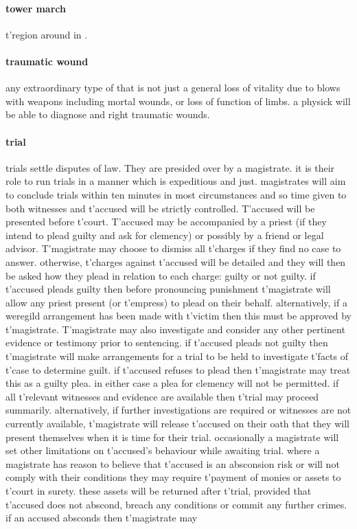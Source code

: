 \paragraph{tower march} t'\allowbreak region around  in .
\paragraph{traumatic wound} any extraordinary type of  that is not just a general loss of vitality due to blows with weapons including mortal wounds, or loss of function of limbs. a physick will be able to diagnose and right traumatic wounds.
\paragraph{trial} trials settle disputes of law. They are presided over by a magistrate. it is their role to run trials in a manner which is expeditious and just. magistrates will aim to conclude trials within ten minutes in most circumstances and so time given to both witnesses and t'\allowbreak accused will be strictly controlled. T'accused will be presented before t'\allowbreak court. T'accused may be accompanied by a priest (if they intend to plead guilty and ask for clemency) or possibly by a friend or legal advisor. T'magistrate may choose to dismiss all t'\allowbreak charges if they find no case to answer. otherwise, t'\allowbreak charges against t'\allowbreak accused will be detailed and they will then be asked how they plead in relation to each charge: guilty or not guilty. if t'\allowbreak accused pleads guilty then before pronouncing punishment t'\allowbreak magistrate will allow any priest present (or t'\allowbreak empress) to plead  on their behalf. alternatively, if a weregild arrangement has been made with t'\allowbreak victim then this must be approved by t'\allowbreak magistrate. T'magistrate may also investigate and consider any other pertinent evidence or testimony prior to sentencing. if t'\allowbreak accused pleads not guilty then t'\allowbreak magistrate will make arrangements for a trial to be held to investigate t'\allowbreak facts of t'\allowbreak case to determine guilt. if t'\allowbreak accused refuses to plead then t'\allowbreak magistrate may treat this as a guilty plea. in either case a plea for clemency will not be permitted. if all t'\allowbreak relevant witnesses and evidence are available then t'\allowbreak trial may proceed summarily. alternatively, if further investigations are required or witnesses are not currently available, t'\allowbreak magistrate will release t'\allowbreak accused on their oath that they will present themselves when it is time for their trial. occasionally a magistrate will set other limitations on t'\allowbreak accused’s behaviour while awaiting trial. where a magistrate has reason to believe that t'\allowbreak accused is an absconsion risk or will not comply with their conditions they may require t'\allowbreak payment of monies or assets to t'\allowbreak court in surety. these assets will be returned after t'\allowbreak trial, provided that t'\allowbreak accused does not abscond, breach any conditions or commit any further crimes. if an accused absconds then t'\allowbreak magistrate may 